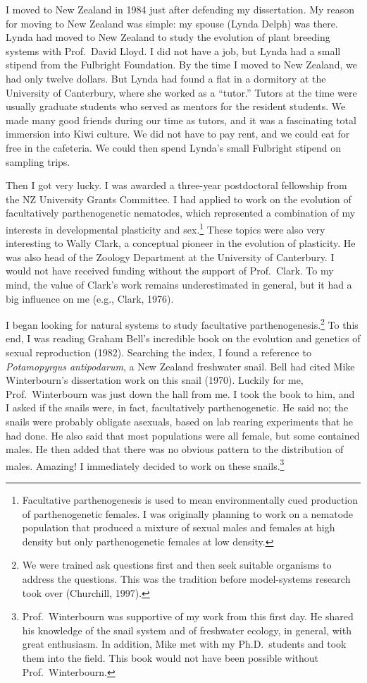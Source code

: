 \documentclass[
  letterpaper,
]{book}
\begin{document}
I moved to New Zealand in 1984 just after defending my dissertation. My
reason for moving to New Zealand was simple: my spouse (Lynda Delph) was
there. Lynda had moved to New Zealand to study the evolution of plant
breeding systems with Prof.~David Lloyd. I did not have a job, but Lynda
had a small stipend from the Fulbright Foundation. By the time I moved
to New Zealand, we had only twelve dollars. But Lynda had found a flat
in a dormitory at the University of Canterbury, where she worked as a
``tutor.'' Tutors at the time were usually graduate students who served
as mentors for the resident students. We made many good friends during
our time as tutors, and it was a fascinating total immersion into Kiwi
culture. We did not have to pay rent, and we could eat for free in the
cafeteria. We could then spend Lynda's small Fulbright stipend on
sampling trips.

Then I got very lucky. I was awarded a three-year postdoctoral
fellowship from the NZ University Grants Committee. I had applied to
work on the evolution of facultatively parthenogenetic nematodes, which
represented a combination of my interests in developmental plasticity
and sex.\footnote{Facultative parthenogenesis is used to mean
  environmentally cued production of parthenogenetic females. I was
  originally planning to work on a nematode population that produced a
  mixture of sexual males and females at high density but only
  parthenogenetic females at low density.} These topics were also very
interesting to Wally Clark, a conceptual pioneer in the evolution of
plasticity. He was also head of the Zoology Department at the University
of Canterbury. I would not have received funding without the support of
Prof.~Clark. To my mind, the value of Clark's work remains
underestimated in general, but it had a big influence on me (e.g.,
Clark, 1976).

I began looking for natural systems to study facultative
parthenogenesis.\footnote{We were trained ask questions first and then
  seek suitable organisms to address the questions. This was the
  tradition before model-systems research took over (Churchill, 1997).}
To this end, I was reading Graham Bell's incredible book on the
evolution and genetics of sexual reproduction (1982). Searching the
index, I found a reference to \emph{Potamopyrgus antipodarum}, a New
Zealand freshwater snail. Bell had cited Mike Winterbourn's dissertation
work on this snail (1970). Luckily for me, Prof.~Winterbourn was just
down the hall from me. I took the book to him, and I asked if the snails
were, in fact, facultatively parthenogenetic. He said no; the snails
were probably obligate asexuals, based on lab rearing experiments that
he had done. He also said that most populations were all female, but
some contained males. He then added that there was no obvious pattern to
the distribution of males. Amazing! I immediately decided to work on
these snails.\footnote{Prof.~Winterbourn was supportive of my work from
  this first day. He shared his knowledge of the snail system and of
  freshwater ecology, in general, with great enthusiasm. In addition,
  Mike met with my Ph.D.~students and took them into the field. This
  book would not have been possible without Prof.~Winterbourn.}
\end{document}
